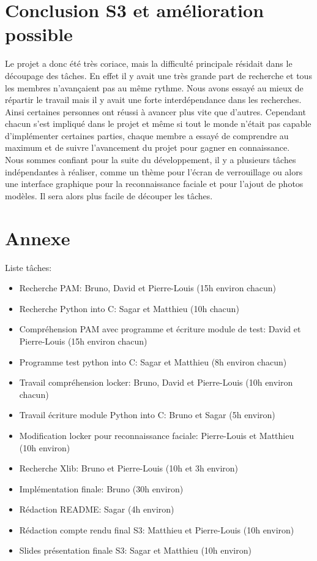 \documentclass{article}
\begin{document}
  \section{Conclusion S3 et amélioration possible}

  Le projet a donc été très coriace, mais la difficulté principale résidait
  dans le découpage des tâches. En effet il y avait une très grande part de
  recherche et tous les membres n’avançaient pas au même rythme. Nous avons
  essayé au mieux de répartir le travail mais il y avait une forte
  interdépendance dans les recherches. Ainsi certaines personnes ont réussi à
  avancer plus vite que d’autres. Cependant chacun s’est impliqué dans le
  projet et même si tout le monde n’était pas capable d’implémenter certaines
  parties, chaque membre a essayé de comprendre au maximum et de suivre
  l’avancement du projet pour gagner en connaissance.
\\
  Nous sommes confiant pour la suite du développement, il y a plusieurs tâches
  indépendantes à réaliser, comme un thème pour l’écran de verrouillage ou
  alors une interface graphique pour la reconnaissance faciale et pour l’ajout
  de photos modèles. Il sera alors plus facile de découper les tâches.

\newpage

  \section*{Annexe}

  Liste tâches:
  \begin{itemize}
  \item{Recherche PAM: Bruno, David et Pierre-Louis (15h environ chacun)}
  \item{Recherche Python into C: Sagar et Matthieu (10h chacun)}
  \item{Compréhension PAM avec programme et écriture module de test: David et
  Pierre-Louis (15h environ chacun)}
  \item{Programme test python into C: Sagar et Matthieu (8h environ chacun)}
  \item{Travail compréhension locker: Bruno, David et Pierre-Louis (10h environ
chacun)}
  \item{Travail écriture module Python into C: Bruno et Sagar (5h environ)}
  \item{Modification locker pour reconnaissance faciale: Pierre-Louis et Matthieu (10h
environ)}
  \item{Recherche Xlib: Bruno et Pierre-Louis (10h et 3h environ)}
  \item{Implémentation finale: Bruno (30h environ)}
  \item{Rédaction README: Sagar (4h environ)}
  \item{Rédaction compte rendu final S3: Matthieu et Pierre-Louis (10h environ)}
  \item{Slides présentation finale S3: Sagar et Matthieu (10h environ)}
\end{itemize}
\end{document}
